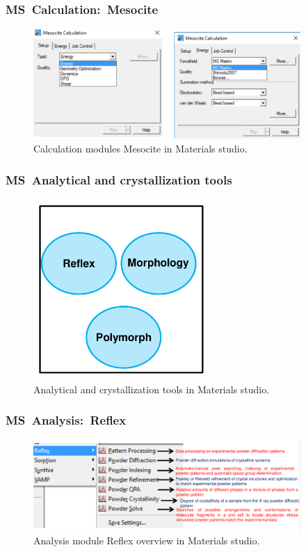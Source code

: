 \frame
{
	\frametitle{\textrm{MS~Calculation:~Mesocite}}
\begin{figure}[h!]
\centering
\includegraphics[height=1.65in,width=4.00in,viewport=0 0 1188 488,clip]{Figures/MS-Caluculator_Mesocite-parameter.png}
\caption{\tiny \textrm{Calculation modules Mesocite in Materials studio.}}%
\label{MS-Mesocite}
\end{figure}
}

\frame
{
	\frametitle{\textrm{MS~Analytical and crystallization tools}}
\begin{figure}[h!]
\centering
\vspace*{-0.18in}
\includegraphics[height=2.70in,width=2.61in,viewport=0 0 850 821,clip]{Figures/MS-Analysis-cry_tools.png}
\caption{\tiny \textrm{Analytical and crystallization tools in Materials studio.}}%
\label{MS-Analysis-cry}
\end{figure}
}

\frame
{
	\frametitle{\textrm{MS~Analysis:~Reflex}}
\begin{figure}[h!]
\centering
\includegraphics[height=1.36in,width=4.00in,viewport=0 0 1374 467,clip]{Figures/MS-Analysis_Reflex.png}
\caption{\tiny \textrm{Analysis module Reflex overview in Materials studio.}}%
\label{MS-Analysis-Reflex-overview}
\end{figure}
}

